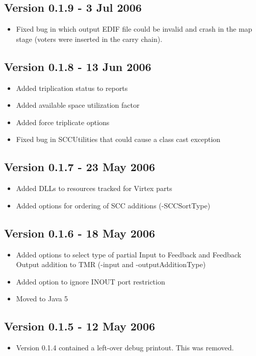 \documentclass[english]{article}
\begin{document}
\subsection*{Version 0.1.9 - 3 Jul 2006}
\begin{itemize}
\item Fixed bug in which output EDIF file could be invalid and crash in the map 
stage (voters were inserted in the carry chain).
\end{itemize}

\subsection*{Version 0.1.8 - 13 Jun 2006}
\begin{itemize}
\item Added triplication status to reports
\item Added available space utilization factor
\item Added force triplicate options
\item Fixed bug in SCCUtilities that could cause a class cast exception
\end{itemize}

\subsection*{Version 0.1.7 - 23 May 2006}
\begin{itemize}
\item Added DLLs to resources tracked for Virtex parts
\item Added options for ordering of SCC additions (-SCCSortType)
\end{itemize}

\subsection*{Version 0.1.6 - 18 May 2006}
\begin{itemize}
\item Added options to select type of partial Input to Feedback and Feedback 
Output addition to TMR (-input and -outputAdditionType)
\item Added option to ignore INOUT port restriction
\item Moved to Java 5
\end{itemize}

\subsection*{Version 0.1.5 - 12 May 2006}
\begin{itemize}
\item Version 0.1.4 contained a left-over debug printout. This was removed.
\end{itemize}
\end{document}
